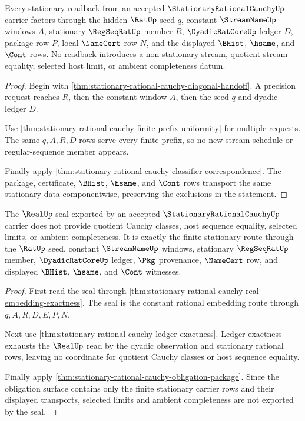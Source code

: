 \begin{theorem}
\label{thm:stationary-rational-cauchy-stationary-readback}
Every stationary readback from an accepted $\StationaryRationalCauchyUp$ carrier factors through the hidden $\RatUp$ seed $q$, constant $\StreamNameUp$ windows $A$, stationary $\RegSeqRatUp$ member $R$, $\DyadicRatCoreUp$ ledger $D$, package row $P$, local $\NameCert$ row $N$, and the displayed $\BHist$, $\hsame$, and $\Cont$ rows. No readback introduces a non-stationary stream, quotient stream equality, selected host limit, or ambient completeness datum.
\end{theorem}
\begin{proof}
Begin with \autoref{thm:stationary-rational-cauchy-diagonal-handoff}. A precision request reaches $R$, then the constant window $A$, then the seed $q$ and dyadic ledger $D$.

Use \autoref{thm:stationary-rational-cauchy-finite-prefix-uniformity} for multiple requests. The same $q,A,R,D$ rows serve every finite prefix, so no new stream schedule or regular-sequence member appears.

Finally apply \autoref{thm:stationary-rational-cauchy-classifier-correspondence}. The package, certificate, $\BHist$, $\hsame$, and $\Cont$ rows transport the same stationary data componentwise, preserving the exclusions in the statement.
\end{proof}

\begin{theorem}
\label{thm:stationary-rational-cauchy-real-seal-non-escape}
The $\RealUp$ seal exported by an accepted $\StationaryRationalCauchyUp$ carrier does not provide quotient Cauchy classes, host sequence equality, selected limits, or ambient completeness. It is exactly the finite stationary route through the $\RatUp$ seed, constant $\StreamNameUp$ windows, stationary $\RegSeqRatUp$ member, $\DyadicRatCoreUp$ ledger, $\Pkg$ provenance, $\NameCert$ row, and displayed $\BHist$, $\hsame$, and $\Cont$ witnesses.
\end{theorem}
\begin{proof}
First read the seal through \autoref{thm:stationary-rational-cauchy-real-embedding-exactness}. The seal is the constant rational embedding route through $q,A,R,D,E,P,N$.

Next use \autoref{thm:stationary-rational-cauchy-ledger-exactness}. Ledger exactness exhausts the $\RealUp$ read by the dyadic observation and stationary rational rows, leaving no coordinate for quotient Cauchy classes or host sequence equality.

Finally apply \autoref{thm:stationary-rational-cauchy-obligation-package}. Since the obligation surface contains only the finite stationary carrier rows and their displayed transports, selected limits and ambient completeness are not exported by the seal.
\end{proof}

